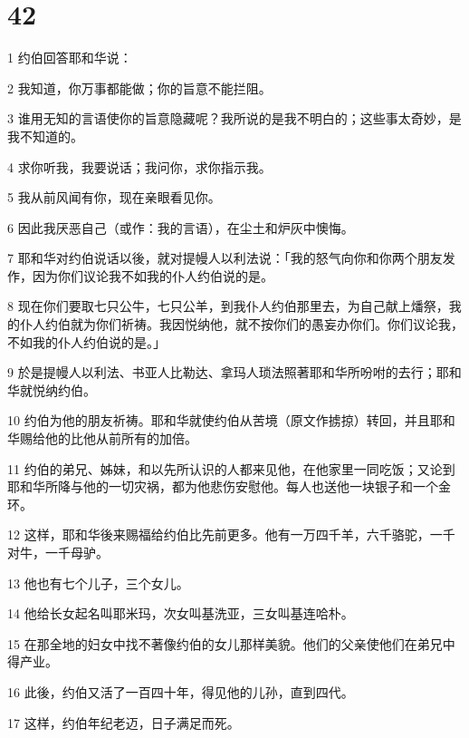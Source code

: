 \chapter{42}

\par 1 约伯回答耶和华说：
\par 2 我知道，你万事都能做；你的旨意不能拦阻。
\par 3 谁用无知的言语使你的旨意隐藏呢？我所说的是我不明白的；这些事太奇妙，是我不知道的。
\par 4 求你听我，我要说话；我问你，求你指示我。
\par 5 我从前风闻有你，现在亲眼看见你。
\par 6 因此我厌恶自己（或作：我的言语），在尘土和炉灰中懊悔。
\par 7 耶和华对约伯说话以後，就对提幔人以利法说：「我的怒气向你和你两个朋友发作，因为你们议论我不如我的仆人约伯说的是。
\par 8 现在你们要取七只公牛，七只公羊，到我仆人约伯那里去，为自己献上燔祭，我的仆人约伯就为你们祈祷。我因悦纳他，就不按你们的愚妄办你们。你们议论我，不如我的仆人约伯说的是。」
\par 9 於是提幔人以利法、书亚人比勒达、拿玛人琐法照著耶和华所吩咐的去行；耶和华就悦纳约伯。
\par 10 约伯为他的朋友祈祷。耶和华就使约伯从苦境（原文作掳掠）转回，并且耶和华赐给他的比他从前所有的加倍。
\par 11 约伯的弟兄、姊妹，和以先所认识的人都来见他，在他家里一同吃饭；又论到耶和华所降与他的一切灾祸，都为他悲伤安慰他。每人也送他一块银子和一个金环。
\par 12 这样，耶和华後来赐福给约伯比先前更多。他有一万四千羊，六千骆驼，一千对牛，一千母驴。
\par 13 他也有七个儿子，三个女儿。
\par 14 他给长女起名叫耶米玛，次女叫基洗亚，三女叫基连哈朴。
\par 15 在那全地的妇女中找不著像约伯的女儿那样美貌。他们的父亲使他们在弟兄中得产业。
\par 16 此後，约伯又活了一百四十年，得见他的儿孙，直到四代。
\par 17 这样，约伯年纪老迈，日子满足而死。


